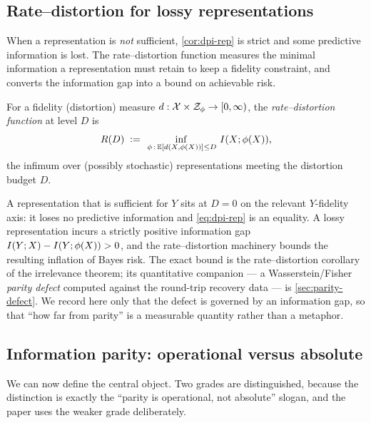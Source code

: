 \subsection{Rate--distortion for lossy representations}
\label{subsec:ratedist}

When a representation is \emph{not} sufficient, \cref{cor:dpi-rep} is strict
and some predictive information is lost. The rate--distortion function
\citep[Ch.~10]{coverthomas2006} measures the minimal information a
representation must retain to keep a fidelity constraint, and converts the
information gap into a bound on achievable risk.

\begin{definition}
\label{def:ratedist}
For a fidelity (distortion) measure $d : \mathcal{X}\times\mathcal{Z}_{\phi} \to
[0,\infty)$, the \emph{rate--distortion function} at level $D$ is
\[
  R(D) \;\vcentcolon=\;
  \inf_{\,\phi \,:\, \mathbb{E}[d(X,\phi(X))]\le D}\, I(X ; \phi(X)),
\]
the infimum over (possibly stochastic) representations meeting the
distortion budget $D$.
\end{definition}

\begin{remark}
\label{rem:lossy-defect}
A representation that is sufficient for $Y$ sits at $D=0$ on the relevant
$Y$-fidelity axis: it loses no predictive information and \eqref{eq:dpi-rep}
is an equality. A lossy representation incurs a strictly positive
information gap $I(Y ; X)-I(Y ; \phi(X)) > 0$, and the rate--distortion
machinery bounds the resulting inflation of Bayes risk. The exact bound is the
rate--distortion corollary of the irrelevance theorem; its quantitative
companion --- a Wasserstein/Fisher \emph{parity defect} computed against the
round-trip recovery data --- is \cref{sec:parity-defect}. We record here only that
the defect is governed by an information gap, so that ``how far from parity''
is a measurable quantity rather than a metaphor.
\end{remark}

\subsection{Information parity: operational versus absolute}
\label{subsec:parity-def}

We can now define the central object. Two grades are distinguished, because
the distinction is exactly the ``parity is operational, not
absolute'' slogan, and the paper uses the weaker grade deliberately.

